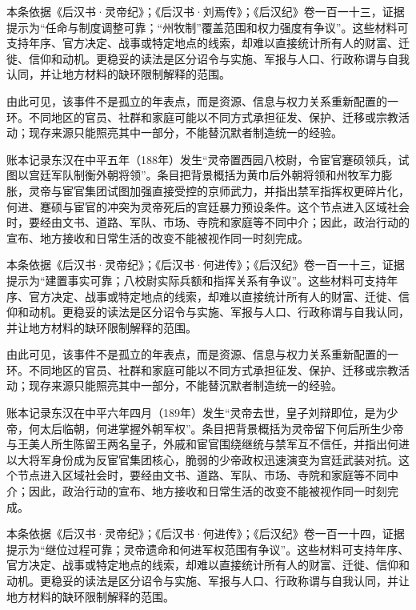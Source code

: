 本条依据《后汉书·灵帝纪》；《后汉书·刘焉传》；《后汉纪》卷一百一十三，证据提示为“任命与制度调整可靠；“州牧制”覆盖范围和权力强度有争议”。这些材料可支持年序、官方决定、战事或特定地点的线索，却难以直接统计所有人的财富、迁徙、信仰和动机。更稳妥的读法是区分诏令与实施、军报与人口、行政称谓与自我认同，并让地方材料的缺环限制解释的范围。

由此可见，该事件不是孤立的年表点，而是资源、信息与权力关系重新配置的一环。不同地区的官员、社群和家庭可能以不同方式承担征发、保护、迁移或宗教活动；现存来源只能照亮其中一部分，不能替沉默者制造统一的经验。

账本记录东汉在中平五年（188年）发生“灵帝置西园八校尉，令宦官蹇硕领兵，试图以宫廷军队制衡外朝将领”。条目把背景概括为黄巾后外朝将领和州牧军力膨胀，灵帝与宦官集团试图加强直接受控的京师武力，并指出禁军指挥权更碎片化，何进、蹇硕与宦官的冲突为灵帝死后的宫廷暴力预设条件。这个节点进入区域社会时，要经由文书、道路、军队、市场、寺院和家庭等不同中介；因此，政治行动的宣布、地方接收和日常生活的改变不能被视作同一时刻完成。

本条依据《后汉书·灵帝纪》；《后汉书·何进传》；《后汉纪》卷一百一十三，证据提示为“建置事实可靠；八校尉实际兵额和指挥关系有争议”。这些材料可支持年序、官方决定、战事或特定地点的线索，却难以直接统计所有人的财富、迁徙、信仰和动机。更稳妥的读法是区分诏令与实施、军报与人口、行政称谓与自我认同，并让地方材料的缺环限制解释的范围。

由此可见，该事件不是孤立的年表点，而是资源、信息与权力关系重新配置的一环。不同地区的官员、社群和家庭可能以不同方式承担征发、保护、迁移或宗教活动；现存来源只能照亮其中一部分，不能替沉默者制造统一的经验。

账本记录东汉在中平六年四月（189年）发生“灵帝去世，皇子刘辩即位，是为少帝，何太后临朝，何进掌握外朝军权”。条目把背景概括为灵帝留下何后所生少帝与王美人所生陈留王两名皇子，外戚和宦官围绕继统与禁军互不信任，并指出何进以大将军身份成为反宦官集团核心，脆弱的少帝政权迅速演变为宫廷武装对抗。这个节点进入区域社会时，要经由文书、道路、军队、市场、寺院和家庭等不同中介；因此，政治行动的宣布、地方接收和日常生活的改变不能被视作同一时刻完成。

本条依据《后汉书·灵帝纪》；《后汉书·何进传》；《后汉纪》卷一百一十四，证据提示为“继位过程可靠；灵帝遗命和何进军权范围有争议”。这些材料可支持年序、官方决定、战事或特定地点的线索，却难以直接统计所有人的财富、迁徙、信仰和动机。更稳妥的读法是区分诏令与实施、军报与人口、行政称谓与自我认同，并让地方材料的缺环限制解释的范围。

